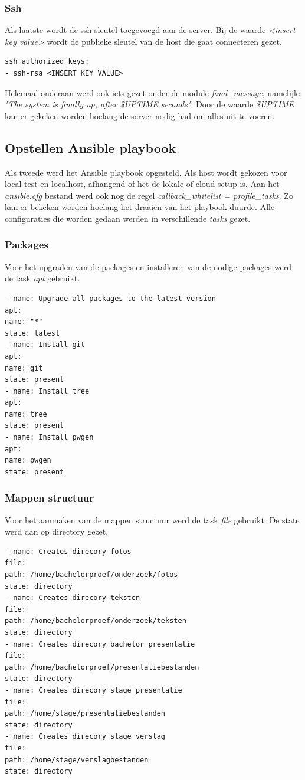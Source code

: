 \subsubsection{Ssh}
Als laatste wordt de ssh sleutel toegevoegd aan de server. Bij de waarde \textit{<insert key value>} wordt de publieke sleutel van de host die gaat connecteren gezet.
\begin{lstlisting}
ssh_authorized_keys:
- ssh-rsa <INSERT KEY VALUE>
\end{lstlisting}

Helemaal onderaan werd ook iets gezet onder de module \textit{final\_message}, namelijk: \textit{"The system is finally up, after \$UPTIME seconds"}. Door de waarde \textit{\$UPTIME} kan er gekeken worden hoelang de server nodig had om alles uit te voeren.

\subsection{Opstellen Ansible playbook}
Als tweede werd het Ansible playbook opgesteld. Als host wordt gekozen voor local-test en localhost, afhangend of het de lokale of cloud setup is. Aan het \textit{ansible.cfg} bestand werd ook nog de regel \textit{callback\_whitelist = profile\_tasks}. Zo kan er bekeken worden hoelang het draaien van het playbook duurde. Alle configuraties die worden gedaan werden in verschillende \textit{tasks} gezet. 

\subsubsection{Packages}
Voor het upgraden van de packages en installeren van de nodige packages werd de task \textit{apt} gebruikt.
\begin{lstlisting}
- name: Upgrade all packages to the latest version
apt:
name: "*"
state: latest
- name: Install git
apt:
name: git
state: present
- name: Install tree
apt:
name: tree
state: present
- name: Install pwgen
apt:
name: pwgen
state: present
\end{lstlisting}
\subsubsection{Mappen structuur}
Voor het aanmaken van de mappen structuur werd de task \textit{file} gebruikt. De state werd dan op directory gezet.
\begin{lstlisting}
- name: Creates direcory fotos
file:
path: /home/bachelorproef/onderzoek/fotos
state: directory
- name: Creates direcory teksten
file:
path: /home/bachelorproef/onderzoek/teksten
state: directory
- name: Creates direcory bachelor presentatie
file:
path: /home/bachelorproef/presentatiebestanden
state: directory
- name: Creates direcory stage presentatie
file:
path: /home/stage/presentatiebestanden
state: directory
- name: Creates direcory stage verslag
file:
path: /home/stage/verslagbestanden
state: directory
\end{lstlisting}
